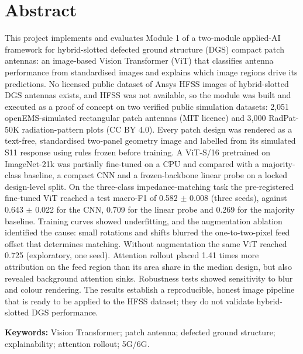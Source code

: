 \documentclass[11pt,a4paper]{article}
\begin{document}
\section*{Abstract}
This project implements and evaluates Module 1 of a two-module applied-AI framework for hybrid-slotted defected ground structure (DGS) compact patch antennas: an image-based Vision Transformer (ViT) that classifies antenna performance from standardised images and explains which image regions drive its predictions. No licensed public dataset of Ansys HFSS images of hybrid-slotted DGS antennas exists, and HFSS was not available, so the module was built and executed as a proof of concept on two verified public simulation datasets: 2,051 openEMS-simulated rectangular patch antennas (MIT licence) and 3,000 RadPat-50K radiation-pattern plots (CC BY 4.0). Every patch design was rendered as a text-free, standardised two-panel geometry image and labelled from its simulated S11 response using rules frozen before training. A ViT-S/16 pretrained on ImageNet-21k was partially fine-tuned on a CPU and compared with a majority-class baseline, a compact CNN and a frozen-backbone linear probe on a locked design-level split. On the three-class impedance-matching task the pre-registered fine-tuned ViT reached a test macro-F1 of 0.582 $\pm$ 0.008 (three seeds), against 0.643 $\pm$ 0.022 for the CNN, 0.709 for the linear probe and 0.269 for the majority baseline. Training curves showed underfitting, and the augmentation ablation identified the cause: small rotations and shifts blurred the one-to-two-pixel feed offset that determines matching. Without augmentation the same ViT reached 0.725 (exploratory, one seed). Attention rollout placed 1.41 times more attribution on the feed region than its area share in the median design, but also revealed background attention sinks. Robustness tests showed sensitivity to blur and colour rendering. The results establish a reproducible, honest image pipeline that is ready to be applied to the HFSS dataset; they do not validate hybrid-slotted DGS performance.

\textbf{Keywords:} Vision Transformer; patch antenna; defected ground structure; explainability; attention rollout; 5G/6G.
\end{document}
